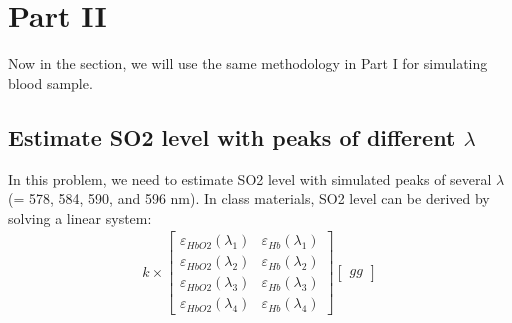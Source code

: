 \documentclass{article}
\begin{document}
\section{Part \RN{2}}
Now in the section, we will use the same methodology in Part \RN{1} for simulating blood sample.

\subsection{Estimate SO2 level with peaks of different $\lambda$}
In this problem, we need to estimate SO2 level with simulated peaks of several $\lambda$ (= 578, 584, 590, and 596 nm). In class
materials, SO2 level can be derived by solving a linear system:
\begin{align}
    k \times
    \begin{bmatrix}
        \varepsilon_{HbO2}(\lambda_1) & \varepsilon_{Hb}(\lambda_1) \\
        \varepsilon_{HbO2}(\lambda_2) & \varepsilon_{Hb}(\lambda_2) \\
        \varepsilon_{HbO2}(\lambda_3) & \varepsilon_{Hb}(\lambda_3) \\
        \varepsilon_{HbO2}(\lambda_4) & \varepsilon_{Hb}(\lambda_4)
    \end{bmatrix}
    \begin{bmatrix}
        gg
    \end{bmatrix}
\end{align}
\end{document}
